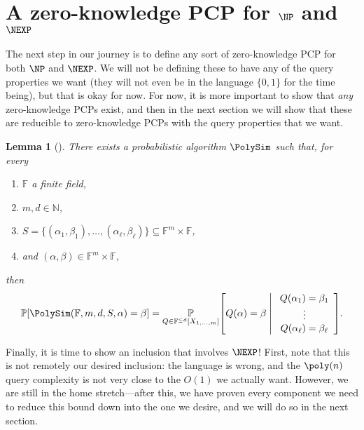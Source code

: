 \documentclass[english,12pt]{reedthesis}
\theoremstyle{plain}
\newtheorem{lemma}[lemma]{Lemma}
\theoremstyle{definition}
\theoremstyle{remark}
\newcommand{\middlemid}{%
  \ensuremath{\;\middle\vert\;}
}
\begin{document}
\section{A zero-knowledge PCP for $\NP$ and $\NEXP$}\label{sec:pzkpcp-np-nexp}

The next step in our journey is to define any sort of zero-knowledge PCP for
both $\NP$ and $\NEXP$. We will not be defining these to have any of the query
properties we want (they will not even be in the language $\{0, 1\}$ for the
time being), but that is okay for now. For now, it is more important to show
that \emph{any} zero-knowledge PCPs exist, and then in the next section we will
show that these are reducible to zero-knowledge PCPs with the query properties
that we want.

\begin{lemma}[{\cite[Corollary 4.10]{BCFGRS17}}]\label{lem:polysim}
  There exists a probabilistic algorithm $\PolySim$ such that, for every
  \begin{enumerate}
    \item $\mathbb{F}$ a finite field,
    \item $m, d \in \mathbb{N}$,
    \item $S = \{(\alpha_{1}, \beta_{1}), \ldots, (\alpha_{\ell}, \beta_{\ell})\} \subseteq \mathbb{F}^{m} \times \mathbb{F}$,
    \item and $(\alpha, \beta) \in \mathbb{F}^{m} \times \mathbb{F}$,
  \end{enumerate}
  then
  \begin{equation}
    \mathbb{P}\mleft[\PolySim(\mathbb{F}, m, d, S, \alpha) = \beta\mright]
    = \underset{Q \in \mathbb{F}^{\le d}[X_{1, \ldots, m}]}{\mathbb{P}}\mleft[
      Q(\alpha) = \beta \middlemid
      \begin{array}{c}
        Q(\alpha_{1}) = \beta_{1} \\
        \vdots \\
        Q(\alpha_{\ell}) = \beta_{\ell}
      \end{array}
    \mright].
  \end{equation}
\end{lemma}

Finally, it is time to show an inclusion that involves $\NEXP$! First, note that
this is not remotely our desired inclusion: the language is wrong, and the
$\poly(n)$ query complexity is not very close to the $O(1)$ we actually want.
However, we are still in the home stretch---after this, we have proven every
component we need to reduce this bound down into the one we desire, and we will
do so in the next section.
\end{document}
